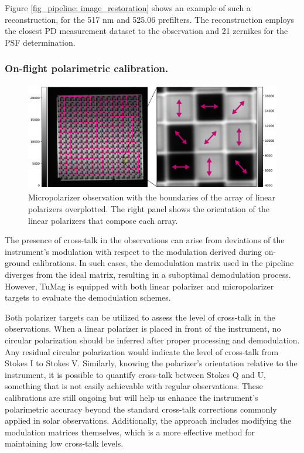 Figure \ref{fig_pipeline:  image_restoration} shows an example of such a reconstruction, for the 517 nm and 525.06 prefilters. The reconstruction employs the closest PD measurement dataset to the observation and 21 zernikes for the PSF determination.   

\subsubsection{On-flight polarimetric calibration.}
\begin{figure}[t]
  \includegraphics[width=\textwidth]{figures/Pipeline/Micrpols_edit.pdf}
  \caption[Micropolarizer observations.]{
   Micropolarizer observation with the boundaries of the array of linear polarizers overplotted. The right panel shows the orientation of the linear polarizers that compose each array.}
    \label{fig_pipeline: micropols_calib}
\end{figure}
The presence of cross-talk in the observations can arise from deviations of the instrument's modulation with respect to the modulation derived during on-ground calibrations. In such cases, the demodulation matrix used in the pipeline diverges from the ideal matrix, resulting in a suboptimal demodulation process. However, TuMag is equipped with both linear polarizer and micropolarizer targets to evaluate the demodulation schemes.

Both polarizer targets can be utilized to assess the level of cross-talk in the observations. When a linear polarizer is placed in front of the instrument, no circular polarization should be inferred after proper processing and demodulation. Any residual circular polarization would indicate the level of cross-talk from Stokes I to Stokes V. Similarly, knowing the polarizer's orientation relative to the instrument, it is possible to quantify cross-talk between Stokes Q and U, something that is not easily achievable with regular observations. These calibrations are still ongoing but will help us enhance the instrument's polarimetric accuracy beyond the standard cross-talk corrections commonly applied in solar observations. Additionally, the approach includes modifying the modulation matrices themselves, which is a more effective method for maintaining low cross-talk levels.

